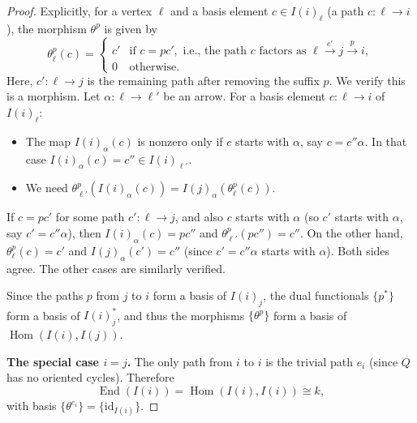 \documentclass[12pt]{amsart}
\begin{document}
\begin{enumerate}
\begin{proof}
    Explicitly, for a vertex $\ell$ and a basis element $c\in I(i)_\ell$ (a path $c\colon\ell\to i$), the morphism $\theta^p$ is given by
    \[
    \theta^p_\ell(c)=
    \begin{cases}
    c' & \text{if } c=pc', \text{ i.e., the path } c \text{ factors as } \ell\xrightarrow{c'} j\xrightarrow{p} i,\\
    0 & \text{otherwise.}
    \end{cases}
    \]
    Here, $c'\colon\ell\to j$ is the remaining path after removing the suffix $p$. We verify this is a morphism. Let $\alpha\colon\ell\to\ell'$ be an arrow. For a basis element $c\colon\ell\to i$ of $I(i)_\ell$:
    \begin{itemize}
    \item The map $I(i)_\alpha(c)$ is nonzero only if $c$ starts with $\alpha$, say $c=c''\alpha$. In that case $I(i)_\alpha(c)=c''\in I(i)_{\ell'}$.
    \item We need $\theta^p_{\ell'}(I(i)_\alpha(c))=I(j)_\alpha(\theta^p_\ell(c))$.
    \end{itemize}
    If $c=pc'$ for some path $c'\colon\ell\to j$, and also $c$ starts with $\alpha$ (so $c'$ starts with $\alpha$, say $c'=c''\alpha$), then $I(i)_\alpha(c)=pc''$ and $\theta^p_{\ell'}(pc'')=c''$. On the other hand, $\theta^p_\ell(c)=c'$ and $I(j)_\alpha(c')=c''$ (since $c'=c''\alpha$ starts with $\alpha$). Both sides agree. The other cases are similarly verified.
    
    \medskip
    Since the paths $p$ from $j$ to $i$ form a basis of $I(i)_j$, the dual functionals $\{p^*\}$ form a basis of $I(i)_j^*$, and thus the morphisms $\{\theta^p\}$ form a basis of $\operatorname{Hom}(I(i),I(j))$.
    
    \medskip\noindent\textbf{The special case $i=j$.}
    The only path from $i$ to $i$ is the trivial path $e_i$ (since $Q$ has no oriented cycles). Therefore
    \[
    \operatorname{End}(I(i))=\operatorname{Hom}(I(i),I(i))\cong k,
    \]
    with basis $\{\theta^{e_i}\}=\{\mathrm{id}_{I(i)}\}$.
\end{proof}


\end{enumerate}
\end{document}
